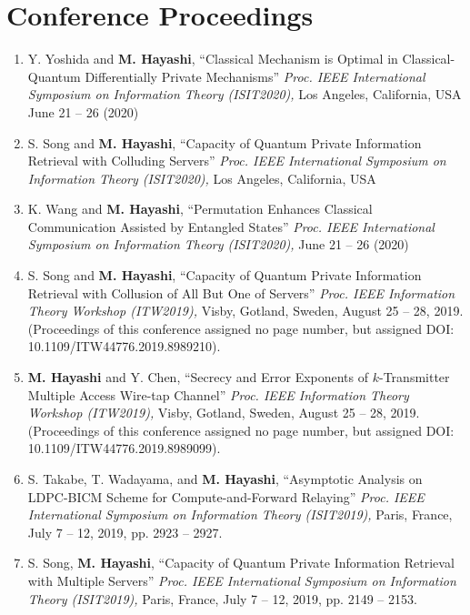 \documentclass[a4paper,12pt,oneside]{article}
\begin{document}
\section{Conference Proceedings}
\begin{enumerate}
\item    
Y. Yoshida and \textbf{M. Hayashi}, 
``Classical Mechanism is Optimal in Classical-Quantum Differentially Private Mechanisms''
{\em Proc. IEEE International Symposium on Information Theory (ISIT2020),} 
Los Angeles, California, USA
June 21 -- 26 (2020)

\item
S. Song and \textbf{M. Hayashi}, 
``Capacity of Quantum Private Information Retrieval with Colluding Servers''
{\em Proc. IEEE International Symposium on Information Theory (ISIT2020),} 
Los Angeles, California, USA

\item
K. Wang and \textbf{M. Hayashi}, 
``Permutation Enhances Classical Communication Assisted by Entangled States''
{\em Proc. IEEE International Symposium on Information Theory (ISIT2020),} 
June 21 -- 26 (2020)

\item 
S. Song and \textbf{M. Hayashi}, 
``Capacity of Quantum Private Information Retrieval with Collusion of All But One of Servers''
{\em Proc. IEEE Information Theory Workshop (ITW2019),} 
Visby, Gotland, Sweden, August 25 -- 28, 2019. 
(Proceedings of this conference assigned no page number, but assigned DOI: 10.1109/ITW44776.2019.8989210).

\item 
\textbf{M. Hayashi} and Y. Chen,
``Secrecy and Error Exponents of $k$-Transmitter Multiple Access Wire-tap Channel''
{\em Proc. IEEE Information Theory Workshop (ITW2019),} 
Visby, Gotland, Sweden, August 25 -- 28, 2019. 
(Proceedings of this conference assigned no page number, but assigned DOI: 10.1109/ITW44776.2019.8989099).

\item 
S. Takabe, T. Wadayama, and \textbf{M. Hayashi}, 
``Asymptotic Analysis on LDPC-BICM Scheme for Compute-and-Forward Relaying''
{\em Proc. IEEE International Symposium on Information Theory (ISIT2019),} 
Paris, France, July 7 -- 12, 2019, pp. 2923 -- 2927. 

\item 
S. Song, \textbf{M. Hayashi}, 
``Capacity of Quantum Private Information Retrieval with Multiple Servers''
{\em Proc. IEEE International Symposium on Information Theory (ISIT2019),} 
Paris, France, July 7 -- 12, 2019, pp. 2149 -- 2153. 


\end{enumerate}
\end{document}
